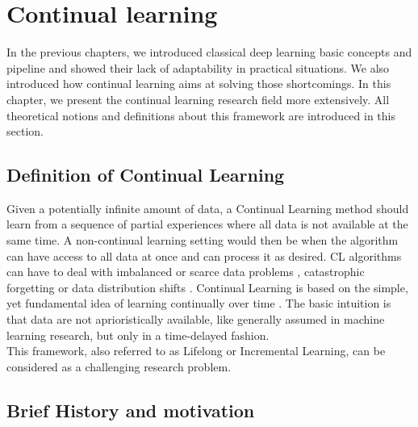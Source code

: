 \documentclass[english, LaM, oneside]{sapthesis}%
\begin{document}
\chapter{Continual learning}
\label{chap:2}
In the previous chapters, we introduced classical deep learning basic concepts and pipeline and showed their lack of adaptability in practical situations. We also introduced how continual learning aims at solving those shortcomings. In this chapter, we present the continual learning research field more extensively. All theoretical notions and definitions about this framework are introduced in this section. 
\section{Definition of Continual Learning}
Given a potentially infinite amount of data, a Continual Learning method should learn from a sequence of partial experiences where all data is not available at the same time. A non-continual learning setting would then be when the algorithm can have access to all data at once and can process it as desired. CL algorithms can have to deal with imbalanced or scarce data problems \cite{drossos}, catastrophic forgetting \cite{sprechamn} or data distribution shifts \cite{gepperth}.
\newline \newline
Continual Learning is based on the simple, yet fundamental idea of learning continually over time \cite{chen-2018, ring}. The basic intuition is that data are not aprioristically available, like generally assumed in machine learning research, but only in a time-delayed fashion.
\\
This framework, also referred to as Lifelong or Incremental Learning, can be considered as a challenging research problem. 

\section{Brief History and motivation}
\end{document}
